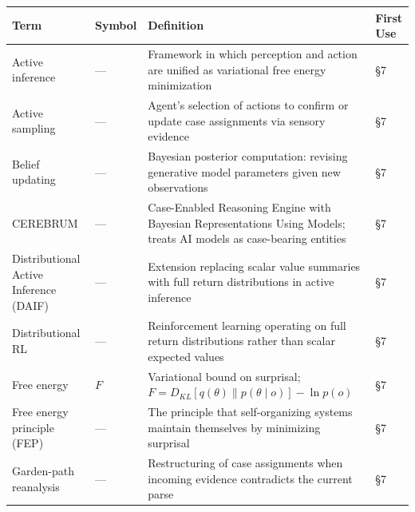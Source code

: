 \documentclass[
]{article}
\newcounter{none} %
\numberwithin{equation}{section}
\begin{document}
{\def\LTcaptype{none} %
\begin{longtable}[]{@{}
  >{\raggedright\arraybackslash}p{}
  >{\centering\arraybackslash}p{}
  >{\raggedright\arraybackslash}p{}
  >{\centering\arraybackslash}p{}@{}}
\toprule\noalign{}
\begin{minipage}[b]{\linewidth}\raggedright
Term
\end{minipage} & \begin{minipage}[b]{\linewidth}\centering
Symbol
\end{minipage} & \begin{minipage}[b]{\linewidth}\raggedright
Definition
\end{minipage} & \begin{minipage}[b]{\linewidth}\centering
First Use
\end{minipage} \\
\midrule\noalign{}
\endhead
\bottomrule\noalign{}
\endlastfoot
Active inference & --- & Framework in which perception and action are
unified as variational free energy minimization & §7 \\
Active sampling & --- & Agent's selection of actions to confirm or
update case assignments via sensory evidence & §7 \\
Belief updating & --- & Bayesian posterior computation: revising
generative model parameters given new observations & §7 \\
CEREBRUM & --- & Case-Enabled Reasoning Engine with Bayesian
Representations Using Models; treats AI models as case-bearing entities
& §7 \\
Distributional Active Inference (DAIF) & --- & Extension replacing
scalar value summaries with full return distributions in active
inference & §7 \\
Distributional RL & --- & Reinforcement learning operating on full
return distributions rather than scalar expected values & §7 \\
Free energy & \(F\) & Variational bound on surprisal;
\(F = D_{KL}[q(\theta) \parallel p(\theta \mid o)] - \ln p(o)\) & §7 \\
Free energy principle (FEP) & --- & The principle that self-organizing
systems maintain themselves by minimizing surprisal & §7 \\
Garden-path reanalysis & --- & Restructuring of case assignments when
incoming evidence contradicts the current parse & §7 \\

\end{longtable}}
\end{document}
